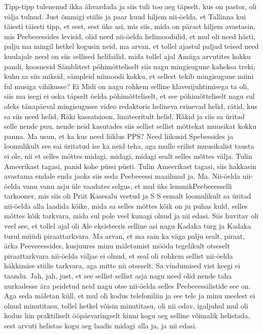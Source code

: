 Tipp-tipp tulenenud ikka ähvardada ja siis tuli too aeg täpselt, kus on pastor, oli välja tulnud.
Just õmmigi stiilis ja paar kuud hiljem nii-öelda, et Tallinna kui täiesti täiesti tipp, et sest, sest üks asi, mis siis, mida on pärast hiljem avastasin, mis Peebeeessides levisid, olid need nii-öelda helimoodulid, et mul oli need hästi, palju ma mingil hetkel kogusin neid, ma arvan, et tollel ajastul paljud teised need kuulajale need on siis sellised helifailid, mida tollel ajal Amiiga arvutites kokku pandi, koosnesid Sämblitest põhimõtteliselt siis nagu mingisugune kaheksa treki, kuhu sa siis miksid, sämpleid niimoodi kokku, et sellest tekib mingisugune miini ful musiga vihikusse? Ei Midi on nagu rohkem selline klaverijuhtimisega ta oli, siis ma isegi ei oska täpselt öelda põhimõtteliselt, et see põhimõtteliselt nagu sul oleks tänapäeval mingisuguses video redaktoris helineva erinevad helid, rätid, kus sa siis need helid, Räki kassatsioon, limiteeritult helid, Räkid ja siis sa üritad selle nende puu, nende neid kasutades siis sellist sellist mõttekat muusikat kokku panna.
Ma usun, et ka kus need liiklus PPS?
Need liikusid Spebessides ja loomulikult see sai üritatud ise ka neid teha, aga mulle erilist muusikalist tausta ei ole, nii et selles mõttes midagi, midagi, midagi sealt selles mõttes välja.
Tulin Ameerikast tagasi, panid kohe püssi püsti.
Tulin Ameerikast tagasi, siis hakkasin avastama endale enda jaoks siis seda Peebeeessi maailmad ja.
Ma.
Nii-öelda nii-öelda vanu vanu asju üle vaadates selgus, et mul üks lemmikPeebeeesselli tarkooner, mis siis oli Priit Kasesalu veetud ja S S esmalt loomulikult sa üritad nii-öelda alla laadida kõike, mida sa selles mõttes kõik on ju puhas kuld, selles mõttes kõik tarkvara, mida sul pole veel kunagi olnud ja nii edasi. Siis huvitav oli veel see, et tollel ajal oli Ale eksisteeris selline asi nagu Kadaka turg ja Kadaka turul müüdi piraattarkvara. Ma arvan, et ma sain ka väga palju sealt, piraat, ärka Peeveeessides, kusjuures minu mäletamist mööda tegelikult otseselt piraattarkvara nii-öelda väljas ei olnud, et seal oli rohkem sellist nii-öelda häkkimise stiilis tarkvara, aga mitte nii otseselt.
Sa vindumised vist keegi ei taandu.
Jah, jah, just, et see sellist sellist asja nagu need olid nende taha nurkadesse ära peidetud neid nagu otse nii-öelda selles Peebeeessilistide see on. Aga seda mäletan küll, et mul oli kodus telefoniliin ja see tele ja minu meelest ei olnud minutitasu, tollel hetkel võisin minutitasu, oli nii odav, igaljuhul mul oli kodus liin praktiliselt ööpäevaringselt kinni kogu aeg selline võimalik helistada, sest arvuti helistas kogu aeg laadis midagi alla ja, ja nii edasi.
